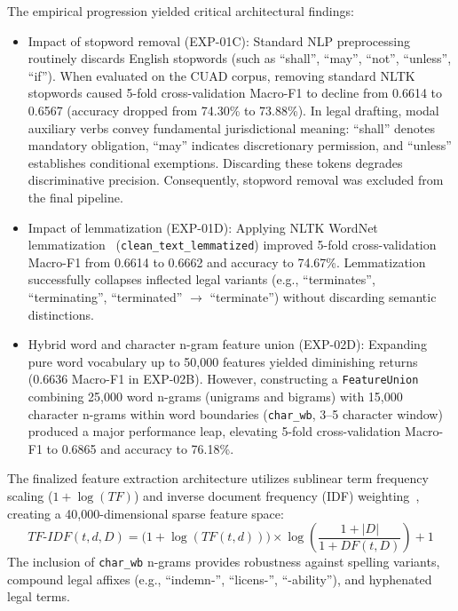 The empirical progression yielded critical architectural findings:
\begin{itemize}
    \item Impact of stopword removal (EXP-01C): Standard NLP preprocessing routinely discards English stopwords (such as ``shall'', ``may'', ``not'', ``unless'', ``if''). When evaluated on the CUAD corpus, removing standard NLTK stopwords caused 5-fold cross-validation Macro-F1 to decline from 0.6614 to 0.6567 (accuracy dropped from 74.30\% to 73.88\%). In legal drafting, modal auxiliary verbs convey fundamental jurisdictional meaning: ``shall'' denotes mandatory obligation, ``may'' indicates discretionary permission, and ``unless'' establishes conditional exemptions. Discarding these tokens degrades discriminative precision. Consequently, stopword removal was excluded from the final pipeline.
    \item Impact of lemmatization (EXP-01D): Applying NLTK WordNet lemmatization~\cite{bird2009natural} (\texttt{clean\_text\_lemmatized}) improved 5-fold cross-validation Macro-F1 from 0.6614 to 0.6662 and accuracy to 74.67\%. Lemmatization successfully collapses inflected legal variants (e.g., ``terminates'', ``terminating'', ``terminated'' $\rightarrow$ ``terminate'') without discarding semantic distinctions.
    \item Hybrid word and character n-gram feature union (EXP-02D): Expanding pure word vocabulary up to 50,000 features yielded diminishing returns (0.6636 Macro-F1 in EXP-02B). However, constructing a \texttt{FeatureUnion} combining 25,000 word n-grams (unigrams and bigrams) with 15,000 character n-grams within word boundaries (\texttt{char\_wb}, 3--5 character window) produced a major performance leap, elevating 5-fold cross-validation Macro-F1 to 0.6865 and accuracy to 76.18\%.
\end{itemize}

The finalized feature extraction architecture utilizes sublinear term frequency scaling ($1 + \log(TF)$) and inverse document frequency (IDF) weighting~\cite{salton1988term, manning2008introduction}, creating a 40,000-dimensional sparse feature space:
\begin{equation}
    TF\text{-}IDF(t, d, D) = \big(1 + \log(TF(t, d))\big) \times \log\left(\frac{1 + |D|}{1 + DF(t, D)}\right) + 1
    \label{eq:sublinear_tfidf}
\end{equation}
The inclusion of \texttt{char\_wb} n-grams provides robustness against spelling variants, compound legal affixes (e.g., ``indemn-'', ``licens-'', ``-ability''), and hyphenated legal terms.

